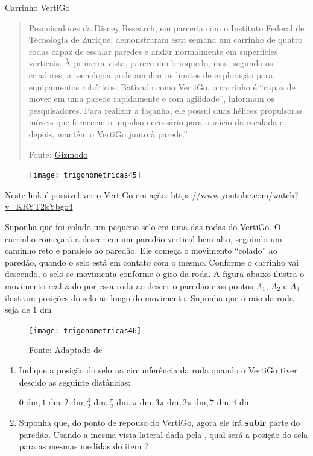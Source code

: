 \begin{task}{Carrinho VertiGo}
\label{trig-ativ10}

\begin{quote}

Pesquisadores da Disney Research, em parceria com o Instituto Federal de Tecnologia de Zurique, demonstraram esta semana um carrinho de quatro rodas capaz de escalar paredes e andar normalmente em superfícies verticais.
À primeira vista, parece um brinquedo, mas, segundo os criadores, a tecnologia pode ampliar os limites de exploração para equipamentos robóticos. Batizado como VertiGo, o carrinho é “capaz de mover em uma parede rapidamente e com agilidade”, informam os pesquisadores. Para realizar a façanha, ele possui duas hélices propulsoras móveis que fornecem o impulso necessário para o início da escalada e, depois, mantém o VertiGo junto à parede.”

\flushright
Fonte: \href{https://gizmodo.uol.com.br/o-novo-robo-da-disney-escala-paredes-como-uma-lagartixa/}{Gizmodo}
\end{quote}


\begin{figure}[H]
\centering

\texttt{[image: trigonometricas45]}
\end{figure}

Neste link é possível ver o VertiGo em ação: \url{https://www.youtube.com/watch?v=KRYT2kYbgo4}


Suponha que foi colado um pequeno selo em uma das rodas do VertiGo. O carrinho começará a descer em um paredão vertical bem alto, seguindo um caminho reto e paralelo ao paredão. Ele começa o movimento “colado”{} ao paredão, quando o selo está em contato com o mesmo. Conforme o carrinho vai descendo, o selo se movimenta conforme o giro da roda. A figura abaixo ilustra o movimento realizado por essa roda ao descer o paredão e os pontos $A_1$, $A_2$ e $A_3$ ilustram posições do selo ao longo do movimento. Suponha que o raio da roda seja de $1$ dm

\begin{figure}[H]
\centering

\texttt{[image: trigonometricas46]}
\caption{Fonte: Adaptado de \cite{ekici2010}}
\label{trigonometrica46}
\end{figure}

\begin{enumerate}
\item Indique a posição do selo na circunferência da roda quando o VertiGo tiver descido as seguinte distâncias:

$0\text{ dm}, 1\text{ dm}, 2\text{ dm}, \frac{3}{2}\text{ dm}, \frac{\pi}{2}\text{ dm}, \pi\text{ dm}, 3\pi\text{ dm}, 2\pi\text{ dm}, 7\text{ dm}, 4\text{ dm}$
\item Suponha que, do ponto de repouso do VertiGo, agora ele irá \textbf{subir} parte do paredão. Usando a mesma vista lateral dada pela , qual será a posição do sela para as mesmas medidas do item ?
\end{enumerate}


\end{task}

